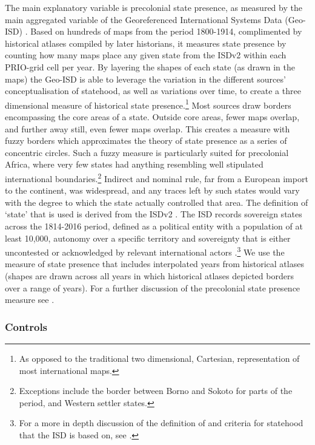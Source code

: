 The main explanatory variable is precolonial state presence, as measured by the
main aggregated variable of the Georeferenced International Systems Data
(Geo-ISD) \citep{Wishman2021}. Based on hundreds of maps from the period
1800-1914, complimented by historical atlases compiled by later historians, it
measures state presence by counting how many maps place any given state from
the ISDv2 within each PRIO-grid cell per year. By layering the shapes of each
state (as drawn in the maps) the Geo-ISD is able to leverage the variation in
the different sources' conceptualisation of statehood, as well as variations
over time, to create a three dimensional measure of historical state
presence.\footnote{As opposed to the traditional two dimensional, Cartesian,
representation of most international maps.} Most sources draw borders
encompassing the core areas of a state. Outside core areas, fewer maps overlap,
and further away still, even fewer maps overlap. This creates a measure with
fuzzy borders which approximates the theory of state presence as a series of
concentric circles. Such a fuzzy measure is particularly suited for precolonial
Africa, where very few states had anything resembling well stipulated
international boundaries.\footnote{Exceptions include the border between Borno
and Sokoto for parts of the period, and Western settler states.} Indirect and
nominal rule, far from a European import to the continent, was widespread, and
any traces left by such states would vary with the degree to which the state
actually controlled that area. The definition of `state' that is used is derived
from the ISDv2 \citep{Butcher2020}. The ISD records sovereign states across the
1814-2016 period, defined as a political entity with a population of at least
10,000, autonomy over a specific territory and sovereignty that is either
uncontested or acknowledged by relevant international actors
\citep{Butcher2020}.\footnote{For a more in depth discussion of the definition
of and criteria for statehood that the ISD is based on, see
\citet{Butcher2017}.} We use the measure of state presence that includes
interpolated years from historical atlases (shapes are drawn across all years in
which historical atlases depicted borders over a range of years). For a further
discussion of the precolonial state presence measure see \citet{Wishman2021}. 

\subsubsection{Controls} \label{Controls}

